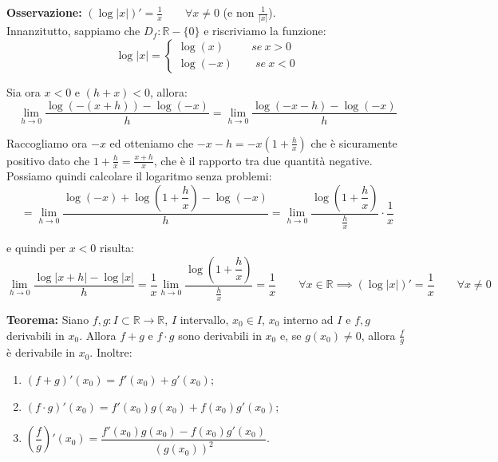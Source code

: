 \documentclass{article}
\begin{document}
\noindent\textbf{Osservazione:} $(\log|x|)' = \frac{1}{x} \qquad \forall x \neq 0$ (e non $\frac{1}{|x|}$).\\
Innanzitutto, sappiamo che $D_f: \mathbb{R} - \{0\}$ e riscriviamo la funzione:
\begin{equation*}
    \log|x| = \begin{cases}
        \log(x) \qquad \ \ se \ x > 0 \\
        \log(-x) \qquad se \ x < 0
    \end{cases}
\end{equation*}

\noindent Sia ora $x < 0$ e $(h + x) < 0$, allora:
\begin{equation*}
    \lim_{h \to 0} \frac{\log(-(x + h)) - \log(-x)}{h} = \lim_{h \to 0} \frac{\log(-x - h) - \log(-x)}{h}
\end{equation*}

\noindent Raccogliamo ora $-x$ ed otteniamo che $-x - h = -x(1 + \frac{h}{x})$ che è sicuramente positivo dato che $1 + \frac{h}{x} = \frac{x + h}{x}$, che è il rapporto tra due quantità negative. Possiamo quindi calcolare il logaritmo senza problemi:
\begin{equation*}
    = \lim_{h \to 0} \frac{\log(-x) + \log\left(1 + \dfrac{h}{x}\right) - \log(-x)}{h} = \lim_{h \to 0} \frac{\log\left(1 + \dfrac{h}{x}\right)}{\frac{h}{x}} \cdot \frac{1}{x} 
\end{equation*}

\noindent e quindi per $x < 0$ risulta:
\begin{equation*}
    \lim_{h \to 0} \frac{\log|x + h| - \log|x|}{h} = \frac{1}{x} \lim_{h \to 0} \frac{\log\left(1 + \dfrac{h}{x}\right)}{\frac{h}{x}} = \frac{1}{x} \qquad \forall x \in \mathbb{R} \implies (\log|x|)' = \frac{1}{x} \qquad \forall x \neq 0
\end{equation*}

\noindent\textbf{Teorema:} Siano $f, g: I \subset \mathbb{R} \xrightarrow{} \mathbb{R}$, $I$ intervallo, $x_0 \in I$, $x_0$ interno ad $I$ e $f, g$ derivabili in $x_0$. Allora $f + g$ e $f \cdot g$ sono derivabili in $x_0$ e, se $g(x_0) \neq 0$, allora $\frac{f}{g}$ è derivabile in $x_0$. Inoltre:
\begin{enumerate}
    \item $(f + g)'(x_0) = f'(x_0) + g'(x_0)$;
    \item $(f \cdot g)'(x_0) = f'(x_0)g(x_0) + f(x_0)g'(x_0)$;
    \item $\left(\dfrac{f}{g}\right)'(x_0) = \dfrac{f'(x_0)g(x_0) - f(x_0)g'(x_0)}{(g(x_0))^2}$.
\end{enumerate}
\end{document}

